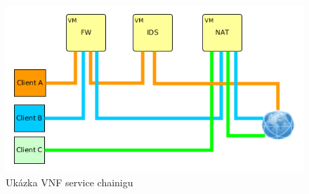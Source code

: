 \begin{figure}[h]
\begin{centering}
\includegraphics[scale=0.55]{images/service_chaining_new}
\par\end{centering}
\caption{Ukázka VNF service chainigu\label{fig:service_chaining_new}}
\end{figure}